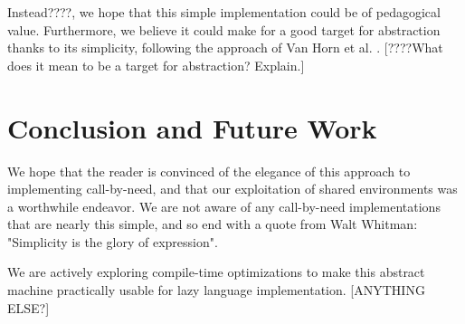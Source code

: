 \documentclass[preprint]{sigplanconf}
\begin{document}
Instead????, we hope that this simple implementation could be of 
pedagogical value. Furthermore, we believe it could make for a good target
for abstraction thanks to its simplicity, following the approach of Van Horn et al.
\cite{van2010abstracting}. [????What does it mean to be a target for abstraction? Explain.]

\section{Conclusion and Future Work}
We hope that the reader is convinced of the elegance of this approach to implementing
call-by-need, and that our exploitation of shared environments was a worthwhile
endeavor. We are not aware of any call-by-need implementations that are nearly
this simple, and so end with a quote from Walt Whitman: "Simplicity is the glory
of expression".

We are actively exploring compile-time optimizations to make this abstract machine
practically usable for lazy language implementation. [ANYTHING ELSE?]



\end{document}
